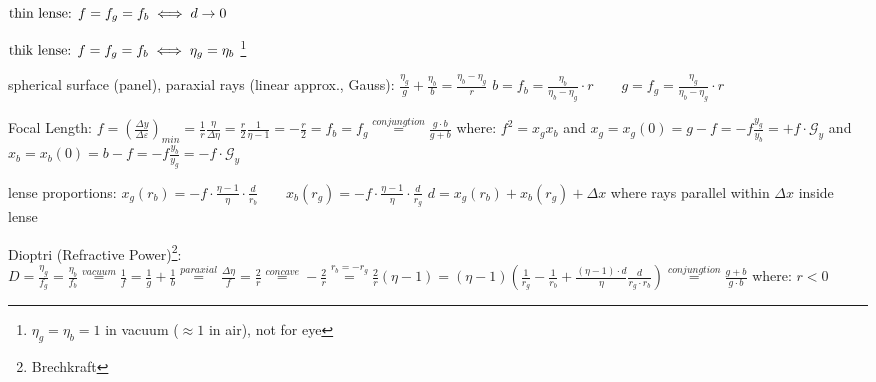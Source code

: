 $
\textnormal{thin lense: } f = f_g = f_b \iff d \rightarrow 0
$
\newline \vspace{2ex}

$
\textnormal{thik lense: } f = f_g = f_b \iff \eta_g = \eta_b 
$ \footnote{ $\eta_g = \eta_b = 1$ in vacuum ($\approx 1$ in air), not for eye }



\vspace{5ex}
spherical surface (panel), paraxial rays (linear approx., Gauss):
\vspace{2ex} \newline \noindent
$
\frac{\eta_g}{g} + \frac{\eta_b}{b} = 
\frac{\eta_b - \eta_g}{r}
$
\vspace{2ex} \newline \noindent
$
b = f_b = \frac{\eta_b}{\eta_b - \eta_g} \cdot r	\qquad
g = f_g = 
\frac{\eta_g}{\eta_b - \eta_g} \cdot r
$


\vspace{5ex}
Focal Length:
\vspace{2ex} \newline
$
f = 
\left( \frac{\Delta y}{\Delta \varepsilon} \right)_{min} = 
\frac{1}{r} \frac{\eta}{\Delta\eta} = 
\frac{r}{2} \frac{1}{\eta - 1} = 
- \frac{r}{2} = 
f_b = f_g
\stackrel{conjungtion}{=}
\frac{g \cdot b}{g + b}
$
\vspace{2ex} \newline
where: $ f^2 = x_g x_b $ and \newline
$ x_g = x_g(0) = g - f = -f \frac{y_g}{y_b} = +f \cdot \mathscr{G}_y $ and \newline 
$ x_b = x_b(0) = b - f = -f \frac{y_b}{y_g} = -f \cdot \mathscr{G}_y $ 


\vspace{5ex}
lense proportions:
\vspace{2ex} \newline \noindent
$
x_g(r_b) = -f \cdot \frac{\eta - 1}{\eta} \cdot \frac{d}{r_b}
\qquad
x_b(r_g) = -f \cdot \frac{\eta - 1}{\eta} \cdot \frac{d}{r_g}
$
\vspace{2ex} \newline \noindent
$
d = x_g(r_b) + x_b(r_g) + \Delta x
$
\qquad
where rays parallel within $\Delta x$ inside lense


\vspace{5ex}
Dioptri (Refractive Power)\footnote{Brechkraft}:
\vspace{2ex} \newline
$
D = 
\frac{\eta_g}{f_g} = 
\frac{\eta_b}{f_b}
\stackrel{vacuum}{=}
\frac{1}{f} = 
\frac{1}{g} + \frac{1}{b} 
\stackrel{paraxial}{=}
\frac{\Delta\eta}{f} =
\frac{2}{r}
\stackrel{concave}{=}
- \frac{2}{r} 
\stackrel{r_b = -r_g}{=}
\frac{2}{r} (\eta - 1) = 
(\eta - 1) \left( \frac{1}{r_g} - \frac{1}{r_b} + \frac{(\eta - 1) \cdot d}{\eta} \frac{d}{r_g \cdot r_b } \right)
\stackrel{conjungtion}{=}
\frac{g + b}{g \cdot b}
$ \qquad where: $ r < 0 $



